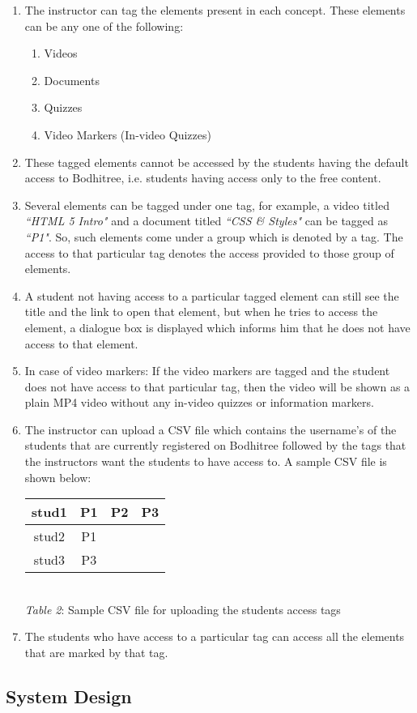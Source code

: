 \begin{enumerate}
	\item The instructor can tag the elements present in each concept. These elements can be any one of the following:
	\begin{enumerate}
		\item Videos
		\item Documents
		\item Quizzes
		\item Video Markers (In-video Quizzes)
	\end{enumerate}
	\item These tagged elements cannot be accessed by the students having the default access to Bodhitree, i.e. students having access only to the free content.
	\item Several elements can be tagged under one tag, for example, a video titled \textit{``HTML 5 Intro"} and a document titled \textit{``CSS \& Styles"} can be tagged as \textit{``P1"}. So, such elements come under a group which is denoted by a tag. The access to that particular tag denotes the access provided to those group of elements.
	\item A student not having access to a particular tagged element can still see the title and the link to open that element, but when he tries to access the element, a dialogue box is displayed which informs him that he does not have access to that element.
	\item In case of video markers: If the video markers are tagged and the student does not have access to that particular tag, then the video will be shown as a plain MP4 video without any in-video quizzes or information markers.
	\item The instructor can upload a CSV file which contains the username's of the students that are currently registered on Bodhitree followed by the tags that the instructors want the students to have access to. A sample CSV file is shown below:
	
	\begin{center}
		\begin{tabular}{|c|c|c|c|}
		\hline \rule[-2ex]{0pt}{5.5ex} stud1 & P1 & P2 & P3 \\ 
		\hline \rule[-2ex]{0pt}{5.5ex} stud2 & P1 &  &  \\ 
		\hline \rule[-2ex]{0pt}{5.5ex} stud3 & P3 &  &  \\ 
		\hline 
		\end{tabular} \\
		\vspace{0.2cm}
		\textit{Table 2}: Sample CSV file for uploading the students access tags
	\end{center}
	
	\item The students who have access to a particular tag can access all the elements that are marked by that tag.
\end{enumerate}

\subsection{System Design}

